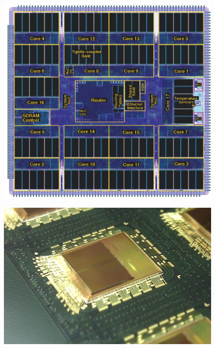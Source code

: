 \begin{figure}
\centering
\begin{minipage}{.6\textwidth}
  \centering
  \includegraphics[width=1\linewidth, natwidth=608, natheight=571]{images/chip.png}
  \label{fig:chip_layout}
\end{minipage}
\begin{minipage}{.3\textwidth}
  \centering
  \includegraphics[width=1\linewidth, natwidth=640, natheight=422]{images/spinn_dies.jpg}
  \label{fig:spinn_dies}
\end{minipage}
\end{figure}


